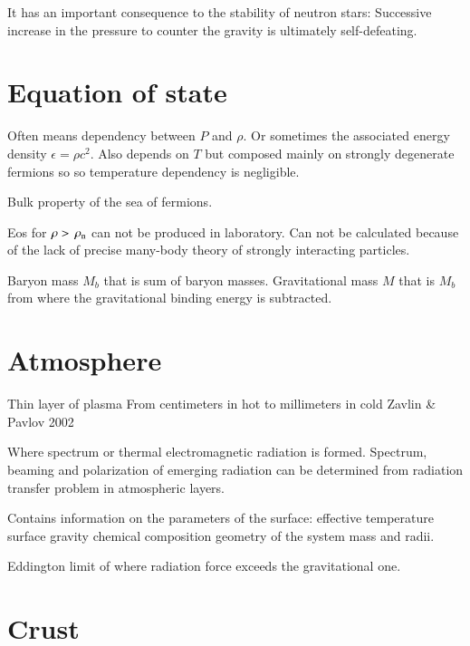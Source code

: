 It has an important consequence to the stability of neutron stars:
Successive increase in the pressure to counter the gravity is ultimately self-defeating.



\section{Equation of state}

Often means dependency between $P$ and $\rho$. 
Or sometimes the associated energy density $\epsilon = \rho c^2$.
Also depends on $T$ but composed mainly on strongly degenerate fermions so so temperature dependency is negligible.

Bulk property of the sea of fermions.

Eos for $\rho > \, \rho_{\mathrm{n}} $ can not be produced in laboratory.
Can not be calculated because of the lack of precise many-body theory of strongly interacting particles.


Baryon mass $M_b$ that is sum of baryon masses.
Gravitational mass $M$ that is $M_b$ from where the gravitational binding energy is subtracted. \cite{Zwicky38}


\section{Atmosphere}
Thin layer of plasma
From centimeters in hot to millimeters in cold 
Zavlin \& Pavlov 2002

Where spectrum or thermal electromagnetic radiation is formed.
Spectrum, beaming and polarization of emerging radiation can be determined from radiation transfer problem in atmospheric layers.

Contains information on the parameters of the surface:
effective temperature
surface gravity
chemical composition
geometry of the system
mass and radii.


Eddington limit of where radiation force exceeds the gravitational one.


\section{Crust}

